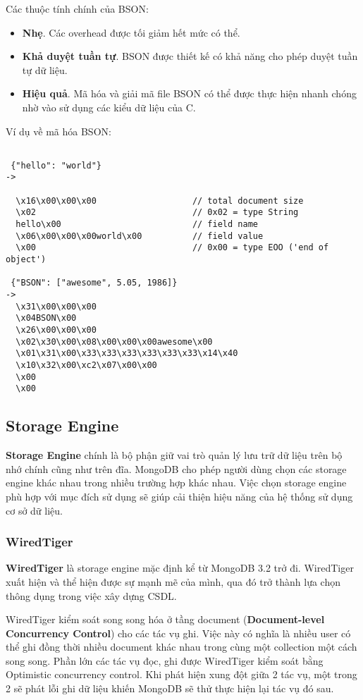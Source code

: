 Các thuộc tính chính của BSON:
\begin{itemize}
\item \textbf{Nhẹ}. Các overhead được tối giảm hết mức có thể.
\item \textbf{Khả duyệt tuần tự}. BSON được thiết kế có khả năng cho phép duyệt tuần tự dữ liệu.
\item \textbf{Hiệu quả}. Mã hóa và giải mã file BSON có thể được thực hiện nhanh chóng nhờ vào sử dụng các kiểu dữ liệu của C.
\end{itemize}
Ví dụ về mã hóa BSON:
\begin{lstlisting}

 {"hello": "world"}
->	

  \x16\x00\x00\x00                   // total document size
  \x02                               // 0x02 = type String
  hello\x00                          // field name
  \x06\x00\x00\x00world\x00          // field value
  \x00                               // 0x00 = type EOO ('end of object')

 {"BSON": ["awesome", 5.05, 1986]}
->	
  \x31\x00\x00\x00
  \x04BSON\x00
  \x26\x00\x00\x00
  \x02\x30\x00\x08\x00\x00\x00awesome\x00
  \x01\x31\x00\x33\x33\x33\x33\x33\x33\x14\x40
  \x10\x32\x00\xc2\x07\x00\x00
  \x00
  \x00
\end{lstlisting}
\subsection{Storage Engine} \label{ssec:MongoDB.4.3}
\textbf{Storage Engine} chính là bộ phận giữ vai trò quản lý lưu trữ dữ liệu trên bộ nhớ chính cũng như trên đĩa. MongoDB cho phép người dùng chọn các storage engine khác nhau trong nhiều trường hợp khác nhau. Việc chọn storage engine phù hợp với mục đích sử dụng sẽ giúp cải thiện hiệu năng của hệ thống sử dụng cơ sở dữ liệu.
\subsubsection{WiredTiger}
\textbf{WiredTiger} là storage engine mặc định kể từ MongoDB 3.2 trở đi. WiredTiger xuất hiện và thể hiện được sự mạnh mẽ của mình, qua đó trở thành lựa chọn thông dụng trong việc xây dựng CSDL.

WiredTiger kiểm soát song song hóa ở tầng document (\textbf{Document-level Concurrency Control}) cho các tác vụ ghi. Việc này có nghĩa là nhiều user có thể ghi đồng thời nhiều document khác nhau trong cùng một collection một cách song song. Phần lớn các tác vụ đọc, ghi được WiredTiger kiểm soát bằng Optimistic concurrency control. Khi phát hiện xung đột giữa 2 tác vụ, một trong 2 sẽ phát lỗi ghi dữ liệu khiến MongoDB sẽ thử thực hiện lại tác vụ đó sau.

